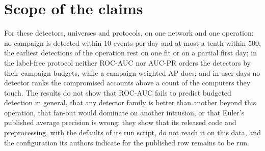 \documentclass[11pt,a4paper]{article}
\begin{document}
\section{Scope of the claims}
\label{sec:scope}
For these detectors, universes and protocols, on one network and one operation: no campaign is detected within 10 events per day and at most a tenth within 500; the earliest detections of the operation rest on one fit or on a partial first day; in the label-free protocol neither ROC-AUC nor AUC-PR orders the detectors by their campaign budgets, while a campaign-weighted AP does; and in user-days no detector ranks the compromised accounts above a count of the computers they touch. The results do not show that ROC-AUC fails to predict budgeted detection in general, that any detector family is better than another beyond this operation, that fan-out would dominate on another intrusion, or that Euler's published average precision is wrong: they show that its released code and preprocessing, with the defaults of its run script, do not reach it on this data, and the configuration its authors indicate for the published row remains to be run.
\end{document}
